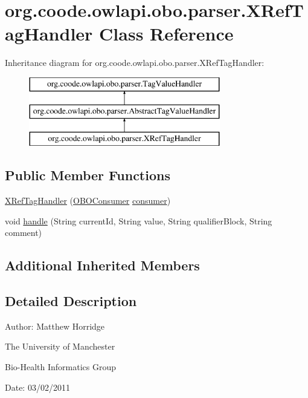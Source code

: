 \hypertarget{classorg_1_1coode_1_1owlapi_1_1obo_1_1parser_1_1_x_ref_tag_handler}{\section{org.\-coode.\-owlapi.\-obo.\-parser.\-X\-Ref\-Tag\-Handler Class Reference}
\label{classorg_1_1coode_1_1owlapi_1_1obo_1_1parser_1_1_x_ref_tag_handler}
}
Inheritance diagram for org.\-coode.\-owlapi.\-obo.\-parser.\-X\-Ref\-Tag\-Handler\-:\begin{figure}[H]
\begin{center}
\leavevmode
\includegraphics[height=3.000000cm]{classorg_1_1coode_1_1owlapi_1_1obo_1_1parser_1_1_x_ref_tag_handler}
\end{center}
\end{figure}
\subsection*{Public Member Functions}
\begin{DoxyCompactItemize}
\item 
\hyperlink{classorg_1_1coode_1_1owlapi_1_1obo_1_1parser_1_1_x_ref_tag_handler_a0d585b1b2c35cd395951a3dc981333c8}{X\-Ref\-Tag\-Handler} (\hyperlink{classorg_1_1coode_1_1owlapi_1_1obo_1_1parser_1_1_o_b_o_consumer}{O\-B\-O\-Consumer} \hyperlink{classorg_1_1coode_1_1owlapi_1_1obo_1_1parser_1_1_abstract_tag_value_handler_ab27f1ff22d15640c5f81585f18265137}{consumer})
\item 
void \hyperlink{classorg_1_1coode_1_1owlapi_1_1obo_1_1parser_1_1_x_ref_tag_handler_a3c14e926789eb2b68371f0f01e082840}{handle} (String current\-Id, String value, String qualifier\-Block, String comment)
\end{DoxyCompactItemize}
\subsection*{Additional Inherited Members}


\subsection{Detailed Description}
Author\-: Matthew Horridge\par
 The University of Manchester\par
 Bio-\/\-Health Informatics Group\par
 Date\-: 03/02/2011 

